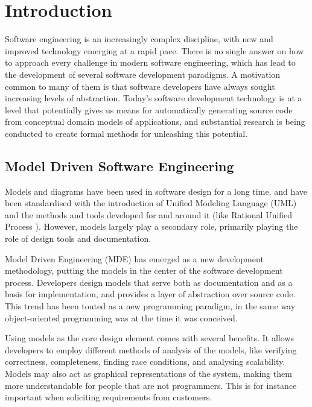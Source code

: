 \chapter{Introduction}
\label{chap:introduction}
 
Software engineering is an increasingly complex discipline, with new and
improved technology emerging at a rapid pace. There is no single answer on how
to approach every challenge in modern software engineering, which has lead to
the development of several software development paradigms. A motivation common
to many of them is that software developers have always sought increasing levels
of abstraction.
Today's software development technology is at a level that potentially gives us
means for automatically generating source code from conceptual domain models of
applications, and substantial research is being conducted to create formal
methods for unleashing this potential.


\section{Model Driven Software Engineering}

Models and diagrams have been used in software design for a long time, and have
been standardised with the introduction of Unified Modeling Language (UML)
\cite{umlInfra} and the methods and tools developed for and around it (like
Rational Unified Process \cite{kruchten2004rational}).
However, models largely play a secondary role, primarily playing the role of
design tools and documentation.

Model Driven Engineering (MDE) \cite{kent2002model} has emerged as a new
development methodology, putting the models in the center of the software
development process. Developers design models that serve both as documentation
and as a basis for implementation, and provides a layer of abstraction over
source code. This trend has been touted as a new programming paradigm, in the
same way object-oriented programming was at the time it was conceived.

Using models as the core design element comes with several benefits. It allows
developers to employ different methods of analysis of the models, like verifying
correctness, completeness, finding race conditions, and analysing scalability.
Models may also act as graphical representations of the system, making them more
understandable for people that are not programmers. This is for instance
important when soliciting requirements from customers.

